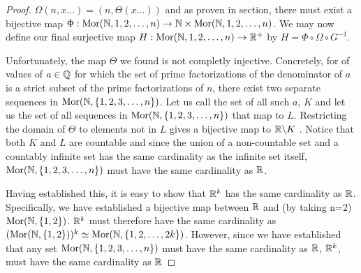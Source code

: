 \begin{itemize}
\begin{proof}
 $\Omega(n,x...)=(n,\Theta(x...))$ and as proven in section, there must exist a bijective map 
 $\Phi: \text{Mor}(\mathbb{N},{1,2,\ldots,n})\to\mathbb{N}\times\text{Mor}(\mathbb{N},{1,2,\ldots,n})$. 
 We may now define our final surjective map $H: \text{Mor}(\mathbb{N},{1,2,\ldots,n})\to\mathbb{R}^+$ by $H=\Phi\circ\Omega\circ G^{-1}$.
 
Unfortunately, the map $\Theta$ we found is not completly injective. Concretely, for of values of $a\in\mathbb{Q}$ for which the set of prime factorizations of the denominator of $a$ is a strict subset of the prime factorizations of $n$, there exist two separate sequences in $\text{Mor}(\mathbb{N},\{1,2,3,\ldots,n\})$. Let us call the set of all such $a$, $K$ and let us the set of all sequences in $\text{Mor}(\mathbb{N},\{1,2,3,\ldots,n\})$ that map to $L$. Restricting the domain of $\Theta$ to elements not in $L$ gives a bijective map to $\mathbb{R}\backslash K$ . 
Notice that both $K$ and $L$ are countable and since the union of a non-countable set and a countably infinite set has the same cardinality as the infinite set itself, $\text{Mor}(\mathbb{N},\{1,2,3,\ldots,n\})$ must have the same cardinality as $\mathbb{R}$.

Having established this, it is easy to show that $\mathbb{R}^k$ has the same cardinality as $\mathbb{R}$. Specifically, we have established a bijective map between $\mathbb{R}$ and (by taking n=2) $\text{Mor}(\mathbb{N},\{1,2\})$. $\mathbb{R}^k$ must therefore have the same cardinality as $(\text{Mor}(\mathbb{N},\{1,2\}))^k\simeq \text{Mor}(\mathbb{N},\{1,2,\ldots,2k\})$. However, since we have established that any set $\text{Mor}(\mathbb{N},\{1,2,3,\ldots,n\})$ must have the same cardinality as $\mathbb{R}$, $\mathbb{R}^k$, must have the same cardinality as $\mathbb{R}$
 \end{proof}


\end{itemize}

